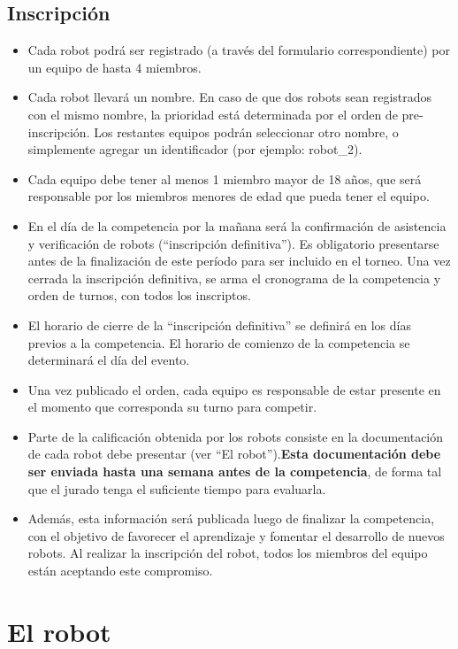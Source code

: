 \documentclass[a4paper,11pt]{article}
\begin{document}
\subsection*{Inscripción}
\begin{itemize}
  \item Cada robot podrá ser registrado (a través del formulario correspondiente) por un equipo de hasta 4 miembros.
  \item Cada robot llevará un nombre. En caso de que dos robots sean registrados con el mismo nombre, la prioridad está determinada por el orden de pre-inscripción. Los restantes equipos podrán seleccionar otro nombre, o simplemente agregar un identificador (por ejemplo: robot\_2).
  \item Cada equipo debe tener al menos 1 miembro mayor de 18 años, que será responsable por los miembros menores de edad que pueda tener el equipo.
  \item En el día de la competencia por la mañana será la confirmación de asistencia y verificación de robots (``inscripción definitiva''). Es obligatorio presentarse antes de la finalización de este período para ser incluido en el torneo. Una vez cerrada la inscripción definitiva, se arma el cronograma de la competencia y orden de turnos, con todos los inscriptos.
  \item El horario de cierre de la ``inscripción definitiva'' se definirá en los días previos a la competencia. El horario de comienzo de la competencia se determinará el día del evento.
  \item Una vez publicado el orden, cada equipo es responsable de estar presente en el momento que corresponda su turno para competir.
  \item Parte de la calificación obtenida por los robots consiste en la documentación de cada robot debe presentar (ver ``El robot'').\textbf{Esta documentación debe ser enviada hasta una semana antes de la competencia}, de forma tal que el jurado tenga el suficiente tiempo para evaluarla.
  \item Además, esta información será publicada luego de finalizar la competencia, con el objetivo de favorecer el aprendizaje y fomentar el desarrollo de nuevos robots. Al realizar la inscripción del robot, todos los miembros del equipo están aceptando este compromiso.
\end{itemize}

\section*{El robot}
\end{document}
